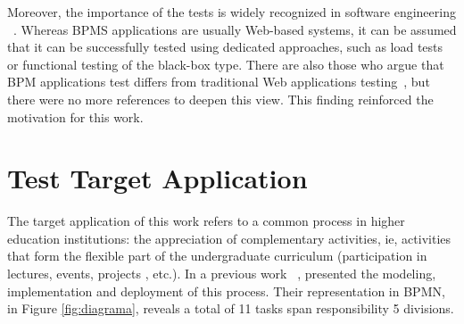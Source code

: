 \documentclass[runningheads,a4paper]{llncs}
\begin{document}
{%
Moreover, the importance of the tests is widely recognized in software engineering ~\cite{swebok14}. 
Whereas BPMS applications are usually Web-based systems, it can be assumed that it can be successfully tested using dedicated approaches, such as load tests or functional testing of the black-box type. There are also those who argue that BPM applications test differs from traditional Web applications testing~\cite{evoke}, but there were no more references to deepen this view. This finding reinforced the motivation for this work. 


\section{Test Target Application}\label{s:apli}


The target application of this work refers to a common process in higher education institutions: the appreciation of complementary activities, ie, activities that form the flexible part of the undergraduate curriculum (participation in lectures, events, projects , etc.). In a previous work ~\cite{sbsi2013}, presented the modeling, implementation and deployment of this process. Their representation in BPMN, in Figure \ref{fig:diagrama}, reveals a total of 11 tasks span responsibility 5 divisions.

}
\end{document}
